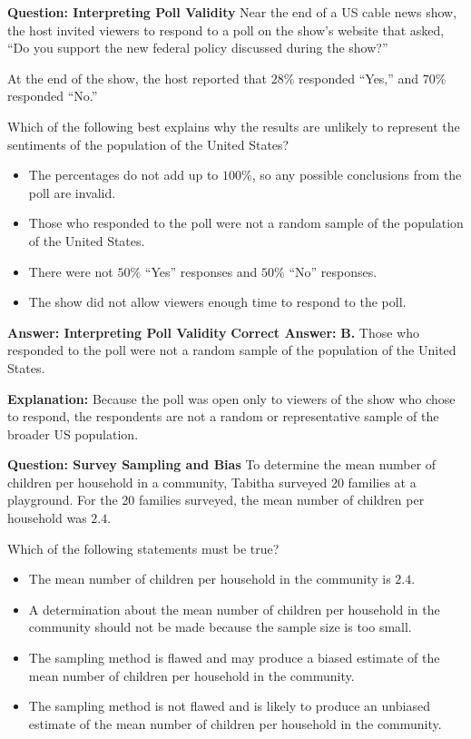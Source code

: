 \documentclass{beamer}
\begin{document}
\begin{frame}{\textbf{Question: Interpreting Poll Validity}}
Near the end of a US cable news show, the host invited viewers to respond to a poll on the show’s website that asked, “Do you support the new federal policy discussed during the show?” 

At the end of the show, the host reported that \(28\%\) responded “Yes,” and \(70\%\) responded “No.” 

Which of the following best explains why the results are unlikely to represent the sentiments of the population of the United States?

\begin{itemize}
    \item[A.] The percentages do not add up to \(100\%\), so any possible conclusions from the poll are invalid.
    \item[B.] Those who responded to the poll were not a random sample of the population of the United States.
    \item[C.] There were not \(50\%\) “Yes” responses and \(50\%\) “No” responses.
    \item[D.] The show did not allow viewers enough time to respond to the poll.
\end{itemize}
\end{frame}

\begin{frame}{\textbf{Answer: Interpreting Poll Validity}}
\textbf{Correct Answer:} \textbf{B.} Those who responded to the poll were not a random sample of the population of the United States.

\textbf{Explanation:} 
Because the poll was open only to viewers of the show who chose to respond, the respondents are not a random or representative sample of the broader US population.
\end{frame}



\begin{frame}{\textbf{Question: Survey Sampling and Bias}}
To determine the mean number of children per household in a community, Tabitha surveyed 20 families at a playground. For the 20 families surveyed, the mean number of children per household was \( 2.4 \). 

Which of the following statements must be true?

\begin{itemize}
    \item[A.] The mean number of children per household in the community is \( 2.4 \).
    \item[B.] A determination about the mean number of children per household in the community should not be made because the sample size is too small.
    \item[C.] The sampling method is flawed and may produce a biased estimate of the mean number of children per household in the community.
    \item[D.] The sampling method is not flawed and is likely to produce an unbiased estimate of the mean number of children per household in the community.
\end{itemize}
\end{frame}
\end{document}
